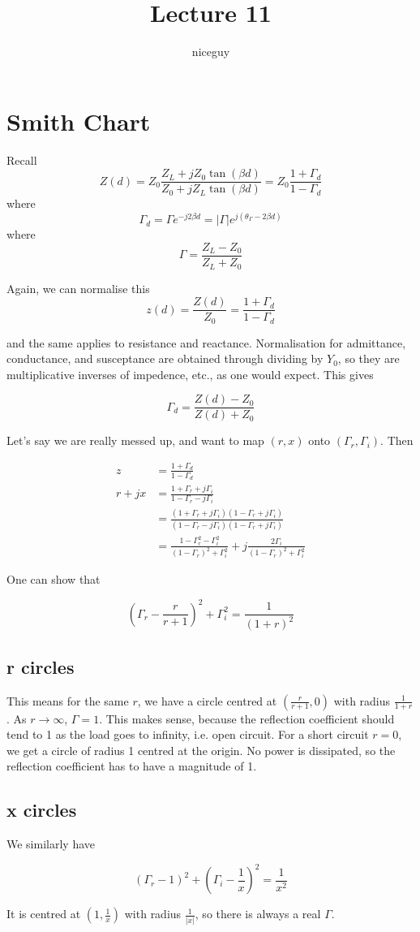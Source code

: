 \documentclass[12pt]{article}
\title{Lecture 11}
\author{niceguy}
\begin{document}
\maketitle

\section{Smith Chart}

Recall
$$Z(d) = Z_0\frac{Z_L + jZ_0\tan(\beta d)}{Z_0 + jZ_L\tan(\beta d)} = Z_0 \frac{1 + \Gamma_d}{1 - \Gamma_d}$$
where
$$\Gamma_d = \Gamma e^{-j2\beta d} = |\Gamma| e^{j(\theta_\Gamma - 2\beta d)}$$
where
$$\Gamma = \frac{Z_L-Z_0}{Z_L+Z_0}$$

Again, we can normalise this
$$z(d) = \frac{Z(d)}{Z_0} = \frac{1+\Gamma_d}{1-\Gamma_d}$$

and the same applies to resistance and reactance. Normalisation for admittance, conductance, and susceptance are obtained through dividing by $Y_0$, so they are multiplicative inverses of impedence, etc., as one would expect. This gives

$$\Gamma_d = \frac{Z(d)-Z_0}{Z(d)+Z_0}$$

Let's say we are really messed up, and want to map $(r,x)$ onto $(\Gamma_r,\Gamma_i)$. Then

\begin{align*}
    z &= \frac{1+\Gamma_d}{1 - \Gamma_d} \\
    r + jx &= \frac{1 + \Gamma_r + j\Gamma_i}{1 - \Gamma_r - j\Gamma_i} \\
           &= \frac{(1 + \Gamma_r + j\Gamma_i)(1 - \Gamma_r + j\Gamma_i)}{(1 - \Gamma_r - j\Gamma_i)(1 - \Gamma_r + j\Gamma_i)} \\
           &= \frac{1 - \Gamma_r^2 - \Gamma_i^2}{(1 - \Gamma_r)^2 + \Gamma_i^2} + j\frac{2\Gamma_i}{(1 - \Gamma_r)^2 + \Gamma_i^2}
\end{align*}

One can show that

$$\left(\Gamma_r - \frac{r}{r+1}\right)^2 + \Gamma_i^2 = \frac{1}{(1+r)^2}$$

\subsection{r circles}

This means for the same $r$, we have a circle centred at $\left(\frac{r}{r+1}, 0\right)$ with radius $\frac{1}{1+r}$. As $r \rightarrow \infty$, $\Gamma = 1$. This makes sense, because the reflection coefficient should tend to 1 as the load goes to infinity, i.e. open circuit. For a short circuit $r = 0$, we get a circle of radius 1 centred at the origin. No power is dissipated, so the reflection coefficient has to have a magnitude of 1.

\subsection{x circles}

We similarly have

$$(\Gamma_r - 1)^2 + \left(\Gamma_i - \frac{1}{x}\right)^2 = \frac{1}{x^2}$$

It is centred at $\left(1, \frac{1}{x}\right)$ with radius $\frac{1}{|x|}$, so there is always a real $\Gamma$.
\end{document}
